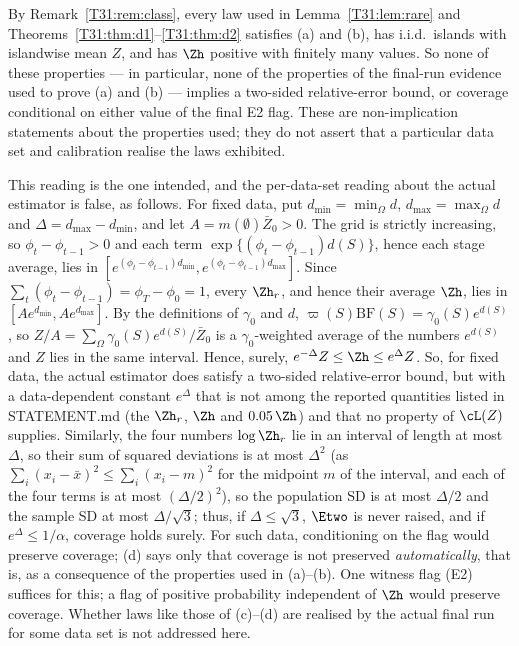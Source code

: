 \documentclass[11pt]{report}
\begin{document}
\begin{T31remark}
By Remark~\ref{T31:rem:class}, every law used in Lemma~\ref{T31:lem:rare} and Theorems~\ref{T31:thm:d1}--\ref{T31:thm:d2} satisfies (a) and
(b), has i.i.d.\ islands with islandwise mean $Z$, and has $\Zh$ positive with finitely many values. So none of these
properties --- in particular, none of the properties of the final-run evidence used to prove (a) and (b) --- implies a
two-sided relative-error bound, or coverage conditional on either value of the final E2 flag. These are non-implication
statements about the properties used; they do not assert that a particular data set and calibration realise the laws
exhibited.

This reading is the one intended, and the per-data-set reading about the actual estimator is false, as follows. For
fixed data, put $d_{\min}=\min_\Omega d$, $d_{\max}=\max_\Omega d$ and $\Delta=d_{\max}-d_{\min}$, and let
$A=m(\emptyset)\bar Z_0>0$. The grid is strictly increasing, so $\phi_t-\phi_{t-1}>0$ and each term
$\exp\{(\phi_t-\phi_{t-1})d(S)\}$, hence each stage average, lies in
$[e^{(\phi_t-\phi_{t-1})d_{\min}},e^{(\phi_t-\phi_{t-1})d_{\max}}]$. Since $\sum_t(\phi_t-\phi_{t-1})=\phi_T-\phi_0=1$, every
$\Zh_r$, and hence their average $\Zh$, lies in $[Ae^{d_{\min}},Ae^{d_{\max}}]$. By the definitions of $\gamma_0$ and $d$,
$\varpi(S)\mathrm{BF}(S)=\gamma_0(S)e^{d(S)}$, so $Z/A=\sum_\Omega\gamma_0(S)e^{d(S)}/\bar Z_0$ is a $\gamma_0$-weighted average
of the numbers $e^{d(S)}$ and $Z$ lies in the same interval. Hence, surely, $e^{-\Delta}Z\le\Zh\le e^{\Delta}Z$. So, for
fixed data, the actual estimator does satisfy a two-sided relative-error bound, but with a data-dependent constant
$e^{\Delta}$ that is not among the reported quantities listed in STATEMENT.md (the $\Zh_r$, $\Zh$ and $0.05\,\Zh$) and that
no property of $\cL(Z)$ supplies. Similarly, the four numbers $\log\Zh_r$ lie in an interval of length at most $\Delta$, so
their sum of squared deviations is at most $\Delta^2$ (as $\sum_i(x_i-\bar x)^2\le\sum_i(x_i-m)^2$ for the midpoint $m$ of
the interval, and each of the four terms is at most $(\Delta/2)^2$), so
the population SD is at most $\Delta/2$ and the sample SD at most $\Delta/\sqrt3$; thus, if $\Delta\le\sqrt3$, $\Etwo$ is
never raised, and if $e^{\Delta}\le1/\alpha$, coverage holds surely. For such data, conditioning on the flag would
preserve coverage; (d) says only that coverage is not preserved \emph{automatically}, that is, as a consequence of the
properties used in (a)--(b). One witness flag (E2) suffices for this; a flag of positive probability independent of
$\Zh$ would preserve coverage. Whether laws like those of (c)--(d) are realised by the actual final run for some data
set is not addressed here.
\end{T31remark}
\end{document}
